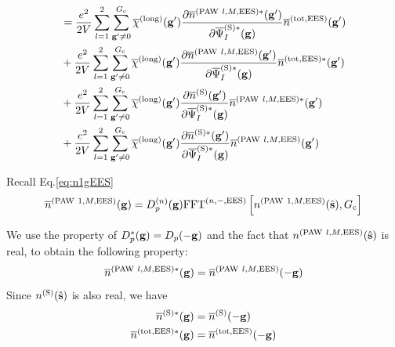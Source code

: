 \documentclass[paper=a4, fontsize=11pt]{article} %
\numberwithin{equation}{section} %
\numberwithin{figure}{section} %
\numberwithin{table}{section} %
\newcommand{\p}{\partial}
\newcommand{\ol}{\overline}
\newcommand{\bs}{{\bf{s}}}
\newcommand{\bg}{{\bf{g}}}
\newcommand{\hs}{{\hat{\bf{s}}}}
\newcommand{\rS}{{\mathrm{S}}}
\newcommand{\rEES}{{\mathrm{EES}}}
\newcommand{\rlong}{{\mathrm{long}}}
\newcommand{\rP}{{\mathrm{PAW}}}
\newcommand{\rtot}{{\mathrm{tot}}}
\newcommand{\psigsc}{{\overline \Psi_I^{(\rS)*}(\bg)}}
\newcommand{\Gc}{{G_{\mathrm{c}}}}
\newcommand{\Dng}{{D^{(n)}_p(\bg)}}
\newcommand{\FFTniEES}{{\mathrm{FFT}^{(n,-,\rEES)}}}
\begin{document}
\begin{equation}
\begin{split}
&= \frac{e^2}{2V}  \sum_{l=1}^2 \sum_{\bg' \neq 0}^{\Gc} \ol \chi^{(\rlong)} (\bg') \frac{\p \ol{n}^{(\rP\ l,M,\rEES)*}(\bg')}{\p \psigsc}\ol{n}^{(\rtot,\rEES)}(\bg') \\
&+ \frac{e^2}{2V}  \sum_{l=1}^2 \sum_{\bg' \neq 0}^{\Gc} \ol \chi^{(\rlong)} (\bg') \frac{\p \ol{n}^{(\rP\ l,M,\rEES)}(\bg')}{\p \psigsc}\ol{n}^{(\rtot,\rEES)*}(\bg') \\
&+ \frac{e^2}{2V}  \sum_{l=1}^2 \sum_{\bg' \neq 0}^{\Gc} \ol \chi^{(\rlong)} (\bg') \frac{\p \ol{n}^{(\rS)}(\bg')}{\p \psigsc}\ol{n}^{(\rP\ l,M,\rEES)*}(\bg') \\
&+ \frac{e^2}{2V}  \sum_{l=1}^2 \sum_{\bg' \neq 0}^{\Gc} \ol \chi^{(\rlong)} (\bg') \frac{\p \ol{n}^{(\rS)*}(\bg')}{\p \psigsc}\ol{n}^{(\rP\ l,M,\rEES)}(\bg') \\
\end{split}
\end{equation}

Recall Eq.\eqref{eq:n1gEES}
\begin{equation}
\begin{split}
 \ol n^{(\rP\ 1,M,\rEES)}(\bg)
 &= \Dng \FFTniEES \left[ n^{(\rP\ 1,M,\rEES)}(\hat \bs), \Gc \right]\\
 \end{split}
\end{equation}

We use the property of $D_p^*(\bg) = D_p(-\bg)$ and the fact that $n^{(\rP\ l,M,\rEES)}(\hat \bs)$ is real, to obtain the following property:
\begin{equation}
\ol n^{(\rP\ l,M,\rEES)*}(\bg) = \ol n^{(\rP\ l,M,\rEES)}(-\bg)
\end{equation}
Since $n^{(\rS)}(\hs)$ is also real, we have
\begin{equation}
\begin{split}
\ol n^{(\rS)*}(\bg) &= \ol n^{(\rS)}(-\bg) \\
\ol n^{(\rtot,\rEES)*}(\bg) &= \ol n^{(\rtot,\rEES)}(-\bg) \\
\end{split}
\end{equation}
\end{document}
